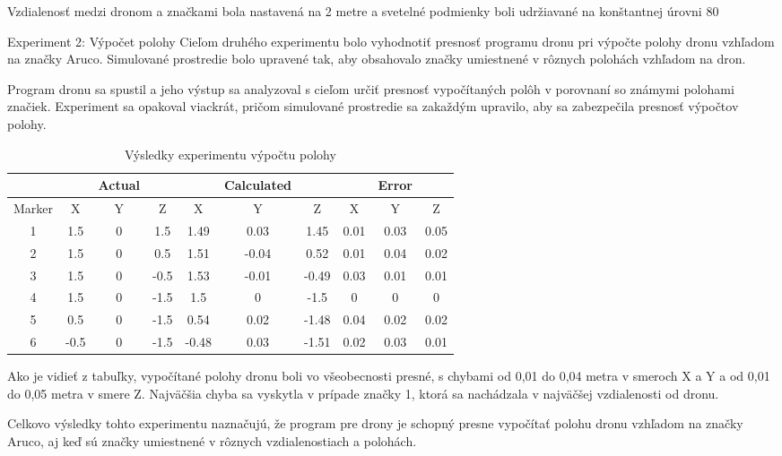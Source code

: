 Vzdialenosť medzi dronom a značkami bola nastavená na 2 metre a svetelné podmienky boli udržiavané na konštantnej úrovni 80 %

Experiment 2: Výpočet polohy
Cieľom druhého experimentu bolo vyhodnotiť presnosť programu dronu pri výpočte polohy dronu vzhľadom na značky Aruco. Simulované prostredie bolo upravené tak, aby obsahovalo značky umiestnené v rôznych polohách vzhľadom na dron.

Program dronu sa spustil a jeho výstup sa analyzoval s cieľom určiť presnosť vypočítaných polôh v porovnaní so známymi polohami značiek. Experiment sa opakoval viackrát, pričom simulované prostredie sa zakaždým upravilo, aby sa zabezpečila presnosť výpočtov polohy.

\begin{table}[h!] 
    \centering
        \begin{tabular}{|c | c c c | c c c | c c c|} 
        \hline
        & & Actual & & & Calculated & & &  Error & \\ [0.5ex] 
        \hline
        Marker &X&Y&Z& X & Y & Z & X & Y & Z \\
        \hline\hline
        1 & 1.5 & 0 & 1.5 & 1.49 & 0.03 & 1.45 & 0.01 & 0.03 & 0.05\\ 
        \hline
        2 & 1.5 & 0 & 0.5 & 1.51 & -0.04 & 0.52 & 0.01 & 0.04 & 0.02\\ 
        \hline
        3 & 1.5 & 0 & -0.5 & 1.53 & -0.01 & -0.49 & 0.03 & 0.01 & 0.01\\ 
        \hline
        4 & 1.5 & 0 & -1.5 & 1.5 & 0 & -1.5 & 0 & 0 & 0\\ 
        \hline
        5 & 0.5 & 0 & -1.5 & 0.54 & 0.02 & -1.48 & 0.04 & 0.02 & 0.02\\ 
        \hline
        6 & -0.5 & 0 & -1.5 & -0.48 & 0.03 & -1.51 & 0.02 & 0.03 & 0.01\\
        \hline 
       \end{tabular}
       \caption{Výsledky experimentu výpočtu polohy}
        \label{table:1}
\end{table}

Ako je vidieť z tabuľky, vypočítané polohy dronu boli vo všeobecnosti presné, s chybami od 0,01 do 0,04 metra v smeroch X a Y a od 0,01 do 0,05 metra v smere Z. Najväčšia chyba sa vyskytla v prípade značky 1, ktorá sa nachádzala v najväčšej vzdialenosti od dronu.

Celkovo výsledky tohto experimentu naznačujú, že program pre drony je schopný presne vypočítať polohu dronu vzhľadom na značky Aruco, aj keď sú značky umiestnené v rôznych vzdialenostiach a polohách.

